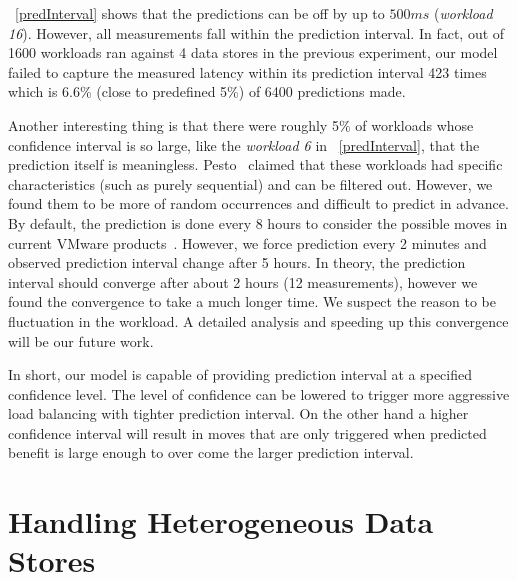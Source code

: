 \figurename~\ref{predInterval} shows that the predictions can be off by up to $500\mathit{ms}$ (\emph{workload 16}).
However, all measurements fall within the prediction interval.
In fact, out of 1600 workloads ran against 4 data stores in the previous experiment, our model failed to capture the measured latency within its prediction interval 423 times which is 6.6\% (close to predefined 5\%) of 6400 predictions made.

Another interesting thing is that there were roughly 5\% of workloads whose confidence interval is so large, like the \emph{workload 6} in \figurename~\ref{predInterval}, that the prediction itself is meaningless.
Pesto~\cite{gulati:2011} claimed that these workloads had specific characteristics (such as purely sequential) and can be filtered out.
However, we found them to be more of random occurrences and difficult to predict in advance.
By default, the prediction is done every 8 hours to consider the possible moves in current VMware products~\cite{epping:2011}.
However, we force prediction every 2 minutes and observed prediction interval change after 5 hours.
In theory, the prediction interval should converge after about 2 hours (12 measurements), however we found the convergence to take a much longer time.
We suspect the reason to be fluctuation in the workload.
A detailed analysis and speeding up this convergence will be our future work.

In short, our model is capable of providing prediction interval at a specified confidence level.
The level of confidence can be lowered to trigger more aggressive load balancing with tighter prediction interval.
On the other hand a higher confidence interval will result in moves that are only triggered when predicted benefit is large enough to over come the larger prediction interval.

\section{Handling Heterogeneous Data Stores}

